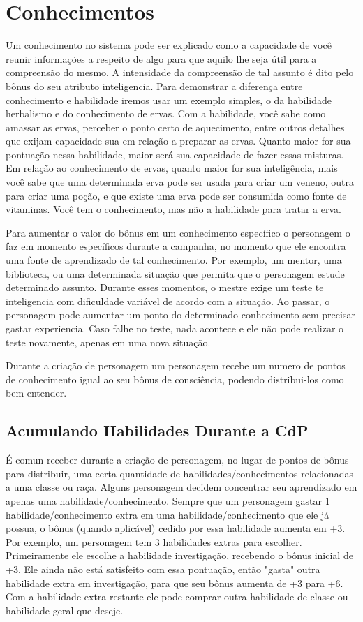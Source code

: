 \section{Conhecimentos}

Um conhecimento no sistema pode ser explicado como a capacidade de você reunir informações a respeito de algo para que aquilo lhe seja útil para a compreensão do mesmo. A intensidade da compreensão de tal assunto é dito pelo bônus do seu atributo inteligencia. Para demonstrar a diferença entre conhecimento e habilidade iremos usar um exemplo simples, o da habilidade herbalismo e do conhecimento de ervas. Com a habilidade, você sabe como amassar as ervas, perceber o ponto certo de aquecimento, entre outros detalhes que exijam capacidade sua em relação a preparar as ervas. Quanto maior for sua pontuação nessa habilidade, maior será sua capacidade de fazer essas misturas. Em relação ao conhecimento de ervas, quanto maior for sua inteligência, mais você sabe que uma determinada erva pode ser usada para criar um veneno, outra para criar uma poção, e que existe uma erva pode ser consumida como fonte de vitaminas. Você tem o conhecimento, mas não a habilidade para tratar a erva.

Para aumentar o valor do bônus em um conhecimento específico o personagem o faz em momento específicos durante a campanha, no momento que ele encontra uma fonte de aprendizado de tal conhecimento. Por exemplo, um mentor, uma biblioteca, ou uma determinada situação que permita que o personagem estude determinado assunto. Durante esses momentos, o mestre exige um teste te inteligencia com dificuldade variável de acordo com a situação. Ao passar, o personagem pode aumentar um ponto do determinado conhecimento sem precisar gastar experiencia. Caso falhe no teste, nada acontece e ele não pode realizar o teste novamente, apenas em uma nova situação.

Durante a criação de personagem um personagem recebe um numero de pontos de conhecimento igual ao seu bônus de consciência, podendo distribui-los como bem entender.


\subsection{Acumulando Habilidades Durante a CdP}

É comun receber durante a criação de personagem, no lugar de pontos de bônus para distribuir, uma certa quantidade de habilidades/conhecimentos relacionadas a uma classe ou raça. Alguns personagem decidem concentrar seu aprendizado em apenas uma habilidade/conhecimento. Sempre que um personagem gastar 1 habilidade/conhecimento extra em uma habilidade/conhecimento que ele já possua, o bônus (quando aplicável) cedido por essa habilidade aumenta em +3. Por exemplo, um personagem tem 3 habilidades extras para escolher. Primeiramente ele escolhe a habilidade investigação, recebendo o bônus inicial de +3. Ele ainda não está satisfeito com essa pontuação, então "gasta" outra habilidade extra em investigação, para que seu bônus aumenta de +3 para +6. Com a habilidade extra restante ele pode comprar outra habilidade de classe ou habilidade geral que deseje. 

